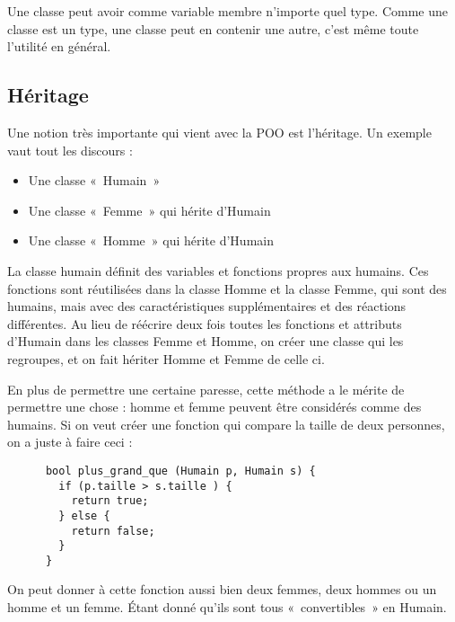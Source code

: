     Une classe peut avoir comme variable membre n'importe quel type. Comme une classe est un type, une classe peut en contenir une autre, c'est même toute l'utilité en général.
  \subsection{Héritage}
    Une notion très importante qui vient avec la POO est l'héritage. Un exemple vaut tout les discours :
      \begin{itemize}
        \item Une classe «~Humain~»
        \item Une classe «~Femme~» qui hérite d'Humain
        \item Une classe «~Homme~» qui hérite d'Humain
      \end{itemize}
    
    La classe humain définit des variables et fonctions propres aux humains. Ces fonctions sont réutilisées dans la classe Homme et la classe Femme, qui sont des humains, mais avec des caractéristiques supplémentaires et des réactions différentes. Au lieu de réécrire deux fois toutes les fonctions et attributs d'Humain dans les classes Femme et Homme, on créer une classe qui les regroupes, et on fait hériter Homme et Femme de celle ci.
    
    En plus de permettre une certaine paresse, cette méthode a le mérite de permettre une chose : homme et femme peuvent être considérés comme des humains. Si on veut créer une fonction qui compare la taille de deux 
    personnes, on a juste à faire ceci :
    \begin{lstlisting}
      bool plus_grand_que (Humain p, Humain s) {
        if (p.taille > s.taille ) {
          return true;
        } else {
          return false;
        }
      }
    \end{lstlisting}
    
    On peut donner à cette fonction aussi bien deux femmes, deux hommes ou un homme et un femme. Étant donné qu'ils sont tous «~convertibles~» en Humain.
